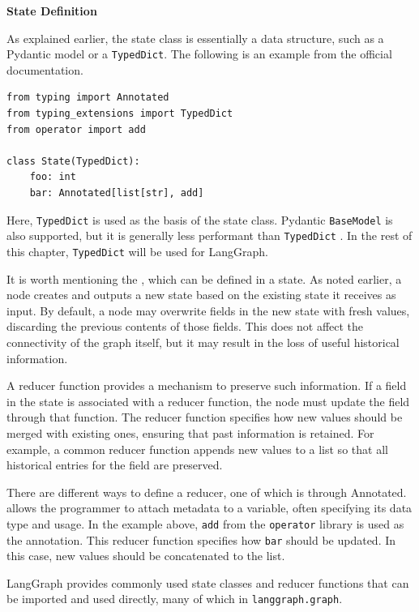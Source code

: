 \vspace{0.1in}
\noindent \textbf{State Definition}
\vspace{0.1in}

As explained earlier, the state class is essentially a data structure, such as a Pydantic model or a \texttt{TypedDict}. The following is an example from the official documentation.

\begin{lstlisting}
from typing import Annotated
from typing_extensions import TypedDict
from operator import add

class State(TypedDict):
    foo: int
    bar: Annotated[list[str], add]
\end{lstlisting}

Here, \texttt{TypedDict} is used as the basis of the state class. Pydantic \texttt{BaseModel} is also supported, but it is generally less performant than \texttt{TypedDict} \cite{langgraph2025compilingYourGraph}. In the rest of this chapter, \texttt{TypedDict} will be used for LangGraph.

It is worth mentioning the , which can be defined in a state. As noted earlier, a node creates and outputs a new state based on the existing state it receives as input. By default, a node may overwrite fields in the new state with fresh values, discarding the previous contents of those fields. This does not affect the connectivity of the graph itself, but it may result in the loss of useful historical information. 

A reducer function provides a mechanism to preserve such information. If a field in the state is associated with a reducer function, the node must update the field through that function. The reducer function specifies how new values should be merged with existing ones, ensuring that past information is retained. For example, a common reducer function appends new values to a list so that all historical entries for the field are preserved.

There are different ways to define a reducer, one of which is through Annotated.  allows the programmer to attach metadata to a variable, often specifying its data type and usage. In the example above, \texttt{add} from the \texttt{operator} library is used as the annotation. This reducer function specifies how \verb|bar| should be updated. In this case, new values should be concatenated to the list.

LangGraph provides commonly used state classes and reducer functions that can be imported and used directly, many of which in \texttt{langgraph.graph}.

